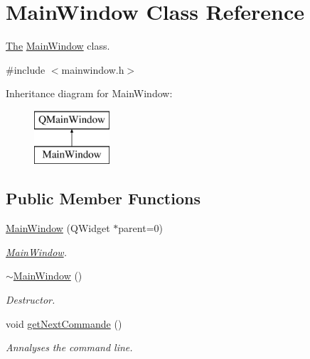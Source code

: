 \hypertarget{class_main_window}{}\section{Main\+Window Class Reference}
\label{class_main_window}


\hyperlink{class_the}{The} \hyperlink{class_main_window}{Main\+Window} class.  




{\ttfamily \#include $<$mainwindow.\+h$>$}

Inheritance diagram for Main\+Window\+:\begin{figure}[H]
\begin{center}
\leavevmode
\includegraphics[height=2.000000cm]{class_main_window}
\end{center}
\end{figure}
\subsection*{Public Member Functions}
\begin{DoxyCompactItemize}
\item 
\hyperlink{class_main_window_a8b244be8b7b7db1b08de2a2acb9409db}{Main\+Window} (Q\+Widget $\ast$parent=0)
\begin{DoxyCompactList}\small\item\em \hyperlink{class_main_window}{Main\+Window}. \end{DoxyCompactList}\item 
\hyperlink{class_main_window_ae98d00a93bc118200eeef9f9bba1dba7}{$\sim$\+Main\+Window} ()
\begin{DoxyCompactList}\small\item\em Destructor. \end{DoxyCompactList}\item 
void \hyperlink{class_main_window_ae9ba81c937937c6218a77ba0ac7a9461}{get\+Next\+Commande} ()\hypertarget{class_main_window_ae9ba81c937937c6218a77ba0ac7a9461}{}\label{class_main_window_ae9ba81c937937c6218a77ba0ac7a9461}

\begin{DoxyCompactList}\small\item\em Annalyses the command line. \end{DoxyCompactList}\end{DoxyCompactItemize}


